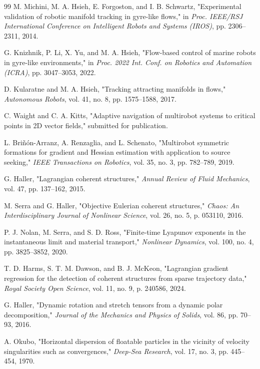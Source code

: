 \documentclass[lettersize,journal]{IEEEtran}
\begin{document}
\begin{thebibliography}{99}
 M. Michini, M. A. Hsieh, E. Forgoston, and I. B. Schwartz,
"Experimental validation of robotic manifold tracking in gyre-like flows,"
in \textit{Proc. IEEE/RSJ International Conference on Intelligent Robots
and Systems (IROS)}, pp. 2306--2311, 2014.

 G. Knizhnik, P. Li, X. Yu, and M. A. Hsieh, "Flow-based control
of marine robots in gyre-like environments," in \textit{Proc. 2022 Int. Conf.
on Robotics and Automation (ICRA)}, pp. 3047--3053, 2022.

 D. Kularatne and M. A. Hsieh, "Tracking attracting manifolds in
flows," \textit{Autonomous Robots}, vol. 41, no. 8, pp. 1575--1588, 2017.

 C. Waight and C. A. Kitts, "Adaptive navigation of multirobot
systems to critical points in 2D vector fields," submitted for publication.

 L. Briñón-Arranz, A. Renzaglia, and L. Schenato, "Multirobot
symmetric formations for gradient and Hessian estimation with application to
source seeking," \textit{IEEE Transactions on Robotics}, vol. 35, no. 3,
pp. 782--789, 2019.

 G. Haller, "Lagrangian coherent structures," \textit{Annual
Review of Fluid Mechanics}, vol. 47, pp. 137--162, 2015.

 M. Serra and G. Haller, "Objective Eulerian coherent
structures," \textit{Chaos: An Interdisciplinary Journal of Nonlinear
Science}, vol. 26, no. 5, p. 053110, 2016.

 P. J. Nolan, M. Serra, and S. D. Ross, "Finite-time Lyapunov
exponents in the instantaneous limit and material transport,"
\textit{Nonlinear Dynamics}, vol. 100, no. 4, pp. 3825--3852, 2020.

 T. D. Harms, S. T. M. Dawson, and B. J. McKeon, "Lagrangian
gradient regression for the detection of coherent structures from sparse
trajectory data," \textit{Royal Society Open Science}, vol. 11, no. 9,
p. 240586, 2024.

 G. Haller, "Dynamic rotation and stretch tensors from a
dynamic polar decomposition," \textit{Journal of the Mechanics and Physics
of Solids}, vol. 86, pp. 70--93, 2016.

 A. Okubo, "Horizontal dispersion of floatable particles in the
vicinity of velocity singularities such as convergences," \textit{Deep-Sea
Research}, vol. 17, no. 3, pp. 445--454, 1970.


\end{thebibliography}
\end{document}
